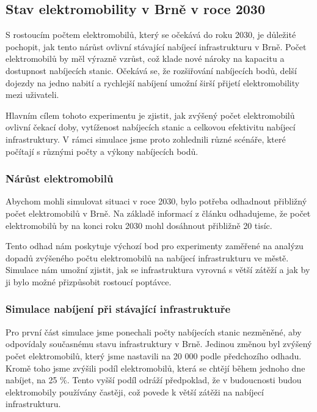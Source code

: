 \documentclass[a4paper,11pt]{article}
\begin{document}
\subsection{Stav elektromobility v Brně v roce 2030}

S rostoucím počtem elektromobilů, který se očekává do roku 2030, je důležité pochopit, jak tento nárůst ovlivní stávající nabíjecí infrastrukturu v Brně. Počet elektromobilů by měl výrazně vzrůst, což klade nové nároky na kapacitu a dostupnost nabíjecích stanic. Očekává se, že rozšiřování nabíjecích bodů, delší dojezdy na jedno nabití a rychlejší nabíjení umožní širší přijetí elektromobility mezi uživateli. \cite{electromobiles_in_future}

Hlavním cílem tohoto experimentu je zjistit, jak zvýšený počet elektromobilů ovlivní čekací doby, vytíženost nabíjecích stanic a celkovou efektivitu nabíjecí infrastruktury. V rámci simulace jsme proto zohlednili různé scénáře, které počítají s různými počty a výkony nabíjecích bodů.

\subsubsection{Nárůst elektromobilů}
Abychom mohli simulovat situaci v roce 2030, bylo potřeba odhadnout přibližný počet elektromobilů v Brně. Na základě informací z článku \cite{ev_growth} odhadujeme, že počet elektromobilů by na konci roku 2030 mohl dosáhnout přibližně 20 tisíc.

Tento odhad nám poskytuje výchozí bod pro experimenty zaměřené na analýzu dopadů zvýšeného počtu elektromobilů na nabíjecí infrastrukturu ve městě. Simulace nám umožní zjistit, jak se infrastruktura vyrovná s větší zátěží a jak by ji bylo možné přizpůsobit rostoucí poptávce.

\subsubsection{Simulace nabíjení při stávající infrastruktuře}
Pro první část simulace jsme ponechali počty nabíjecích stanic nezměněné, aby odpovídaly současnému stavu infrastruktury v Brně. Jedinou změnou byl zvýšený počet elektromobilů, který jsme nastavili na 20 000 podle předchozího odhadu. Kromě toho jsme zvýšili podíl elektromobilů, která se chtějí během jednoho dne nabíjet, na 25 \%. Tento vyšší podíl odráží předpoklad, že v budoucnosti budou elektromobily používány častěji, což povede k větší zátěži na nabíjecí infrastrukturu.
\end{document}

